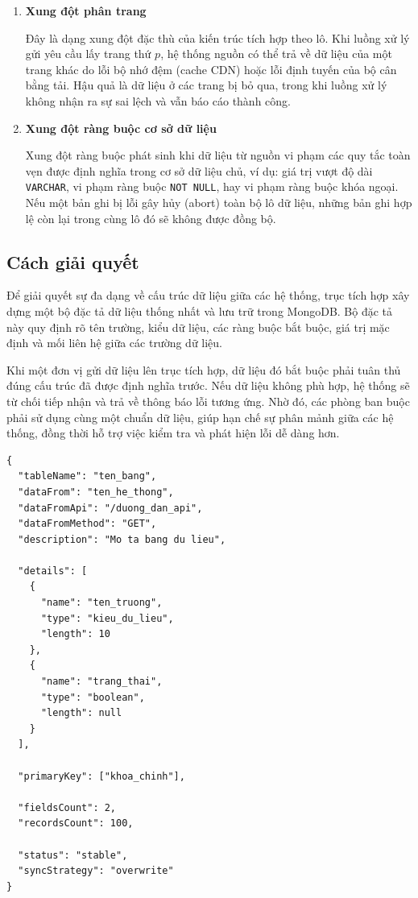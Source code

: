 \begin{enumerate}
    \item \textbf{Xung đột phân trang}

    Đây là dạng xung đột đặc thù của kiến trúc tích hợp theo lô. Khi luồng xử lý gửi yêu cầu lấy trang thứ $p$, hệ thống nguồn có thể trả về dữ liệu của một trang khác do lỗi bộ nhớ đệm (cache CDN) hoặc lỗi định tuyến của bộ cân bằng tải. Hậu quả là dữ liệu ở các trang bị bỏ qua, trong khi luồng xử lý không nhận ra sự sai lệch và vẫn báo cáo thành công.

    \item \textbf{Xung đột ràng buộc cơ sở dữ liệu}

    Xung đột ràng buộc phát sinh khi dữ liệu từ nguồn vi phạm các quy tắc toàn vẹn được định nghĩa trong cơ sở dữ liệu chủ, ví dụ: giá trị vượt độ dài \texttt{VARCHAR}, vi phạm ràng buộc \texttt{NOT NULL}, hay vi phạm ràng buộc khóa ngoại. Nếu một bản ghi bị lỗi gây hủy (abort) toàn bộ lô dữ liệu, những bản ghi hợp lệ còn lại trong cùng lô đó sẽ không được đồng bộ.
\end{enumerate}



\subsection{Cách giải quyết}

Để giải quyết sự đa dạng về cấu trúc dữ liệu giữa các hệ thống, trục tích hợp xây dựng một bộ đặc tả dữ liệu thống nhất và lưu trữ trong MongoDB. Bộ đặc tả này quy định rõ tên trường, kiểu dữ liệu, các ràng buộc bắt buộc, giá trị mặc định và mối liên hệ giữa các trường dữ liệu.

Khi một đơn vị gửi dữ liệu lên trục tích hợp, dữ liệu đó bắt buộc phải tuân thủ đúng cấu trúc đã được định nghĩa trước. Nếu dữ liệu không phù hợp, hệ thống sẽ từ chối tiếp nhận và trả về thông báo lỗi tương ứng. Nhờ đó, các phòng ban buộc phải sử dụng cùng một chuẩn dữ liệu, giúp hạn chế sự phân mảnh giữa các hệ thống, đồng thời hỗ trợ việc kiểm tra và phát hiện lỗi dễ dàng hơn.

\begin{lstlisting}[caption={Ví dụ đặc tả dữ liệu tổng quát trong MongoDB}, label={lst:mongo-schema}]
{
  "tableName": "ten_bang",
  "dataFrom": "ten_he_thong",
  "dataFromApi": "/duong_dan_api",
  "dataFromMethod": "GET",
  "description": "Mo ta bang du lieu",

  "details": [
    {
      "name": "ten_truong",
      "type": "kieu_du_lieu",
      "length": 10
    },
    {
      "name": "trang_thai",
      "type": "boolean",
      "length": null
    }
  ],

  "primaryKey": ["khoa_chinh"],

  "fieldsCount": 2,
  "recordsCount": 100,

  "status": "stable",
  "syncStrategy": "overwrite"
}
\end{lstlisting}

